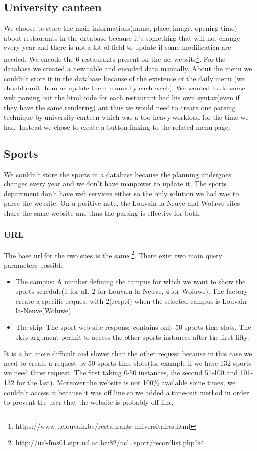 \documentclass{eplmastersthesis}
\begin{document}
\subsection{University canteen}
We choose to store the main informations(name, place, image, opening time) about restaurants in the database because it's  something that will not change every year and there is not a lot of field to update if some modification are needed. We encode the 6 restaurants present on the ucl website\footnote{https://www.uclouvain.be/restaurants-universitaires.html}. For the database we created a new table and encoded data manually. About the menu we couldn't store it in the database because of the existence of the daily menu (we should omit them or update them manually each week). We wanted to do some web parsing but the html code for each restaurant had his own syntax(even if they have the same rendering) ant thus we would need to create one parsing technique by university canteen which was a too heavy workload for the time we had. Instead we chose to create a button linking to the related menu page.
\subsection{Sports}
We couldn't store the sports in a database because the planning undergoes changes every year and we don't have manpower to update it. The sports department don't have web services either so the only solution we had was to parse the website. On a positive note, the Louvain-la-Neuve and Woluwe sites share the same website and thus the parsing is effective for both. 
\subsubsection{URL}
The base url for the two sites is the same \footnote{\url{http://ucl-fms01.sipr.ucl.ac.be:82/ucl_sport/recordlist.php?}}. There exist two main query parameters possible
\begin{itemize}
\item The campus: A number defining the campus for which we want to show the sports schedule(1 for all, 2 for Louvain-la-Neuve, 4 for Woluwe). The factory create a specific request with 2(resp.4) when the selected campus is Louvain-la-Neuve(Woluwe)
\item The skip: The sport web site response contains only 50 sports time slots. The skip argument permit to access the other sports instances after the first fifty.
\end{itemize}
It is a bit more difficult and slower than the other request because in this case we need to create a request by 50 sports time slots(for example if we have 132 sports we need three request. The first taking 0-50 instances, the second 51-100 and 101-132 for the last). Moreover the website is not 100\% available some times, we couldn't access it because it was off line so we added a time-out method in order to prevent the user that the website is probably off-line.
\end{document}
